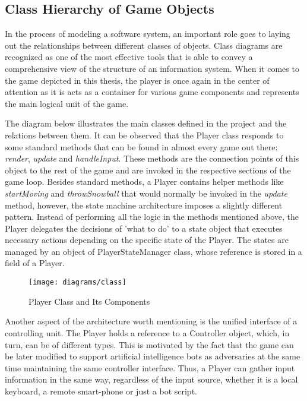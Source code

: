 \newpage

\subsection{Class Hierarchy of Game Objects}

In the process of modeling a software system, an important role goes to laying
out the relationships between different classes of objects. Class diagrams are
recognized as one of the most effective tools that is able to convey a
comprehensive view of the structure of an information system. When it comes to
the game depicted in this thesis, the player is once again in the center of
attention as it is acts as a container for various game components and
represents the main logical unit of the game.

The diagram below illustrates the main classes defined in the project and the
relations between them. It can be observed that the Player class responds to
some standard methods that can be found in almost every game out there:
\emph{render}, \emph{update} and \emph{handleInput}. These methods are the
connection points of this object to the rest of the game and are invoked in the
respective sections of the game loop. Besides standard methods, a Player
contains helper methods like \emph{startMoving} and \emph{throwSnowball} that
would normally be invoked in the \emph{update} method, however, the state
machine architecture imposes a slightly different pattern. Instead of performing
all the logic in the methods mentioned above, the Player delegates the decisions
of 'what to do' to a state object that executes necessary actions depending on
the specific state of the Player. The states are managed by an object of
PlayerStateManager class, whose reference is stored in a field of a Player.

\begin{figure}[!h]
\centering
\texttt{[image: diagrams/class]}
\caption{Player Class and Its Components}\label{diag:class}
\end{figure}

Another aspect of the architecture worth mentioning is the unified interface of
a controlling unit. The Player holds a reference to a Controller object, which,
in turn, can be of different types. This is motivated by the fact that the game
can be later modified to support artificial intelligence bots as adversaries at
the same time maintaining the same controller interface. Thus, a Player can
gather input information in the same way, regardless of the input source,
whether it is a local keyboard, a remote smart-phone or just a bot script.

